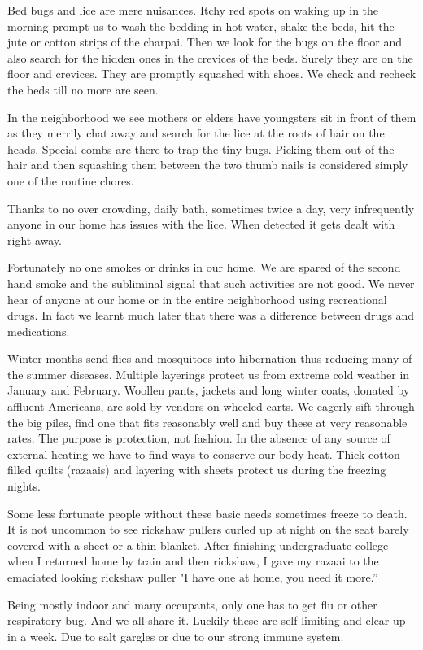 Bed bugs and lice are mere nuisances.  Itchy red spots on waking up in the
morning prompt us to wash the bedding in hot water, shake the beds, hit
the jute or cotton strips of the charpai. Then we look for the bugs on the
floor and also search for the hidden ones in the crevices of the beds.
Surely they are on the floor and crevices. They are promptly squashed with
shoes. We check and recheck the beds till no more are seen. 

In the neighborhood we see mothers or elders have youngsters sit in front
of them as they merrily chat away and search for the lice at the roots of
hair on the heads. Special combs are there to trap the tiny bugs. Picking
them out of the hair and then squashing them between the two thumb nails
is considered simply one of the routine chores. 

Thanks to no over crowding, daily bath, sometimes twice a day, very
infrequently anyone in our home has issues with the lice. When detected it
gets dealt with right away. 

Fortunately no one smokes or drinks in our home. We are spared of the
second hand smoke and the subliminal signal that such activities are not
good. We never hear of anyone at our home or in the entire neighborhood
using recreational drugs. In fact we learnt much later that there was
a difference between drugs and medications. 

Winter months send flies and mosquitoes into hibernation thus reducing
many of the summer diseases. Multiple layerings protect us from extreme
cold weather in January and February. Woollen pants, jackets and long
winter coats, donated by affluent Americans, are sold by vendors on
wheeled carts.  We eagerly sift through the big piles, find one that fits
reasonably well and buy these at very reasonable rates. The purpose is
protection, not fashion. In the absence of any source of external heating
we have to find ways to conserve our body heat. Thick cotton filled quilts
(razaais) and layering with sheets protect us during the freezing nights. 

Some less fortunate people without these basic needs sometimes freeze to
death. It is not uncommon to see rickshaw pullers curled up at night on
the seat barely covered with a sheet or a thin blanket. After finishing
undergraduate college when I returned home by train and then rickshaw,
I gave my razaai to the emaciated looking rickshaw puller "I have one at
home, you need it more.”

Being mostly indoor and many occupants, only one has to get flu or other
respiratory bug. And we all share it. Luckily these are self limiting and
clear up in a week. Due to salt gargles or due to our strong immune
system. 

